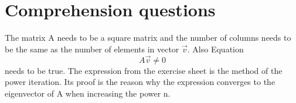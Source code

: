 \setcounter{section}{-1}
\section{Comprehension questions}
The matrix A needs to be a square matrix and the number of columns needs to be the same as the number of elements in vector $\vec{v}$.
Also Equation
\begin{equation}
A \vec{v} \neq 0
\end{equation}
needs to be true.
The expression from the exercise sheet is the method of the power iteration. Its proof is the reason why the expression converges to the eigenvector of A when increasing the power n.